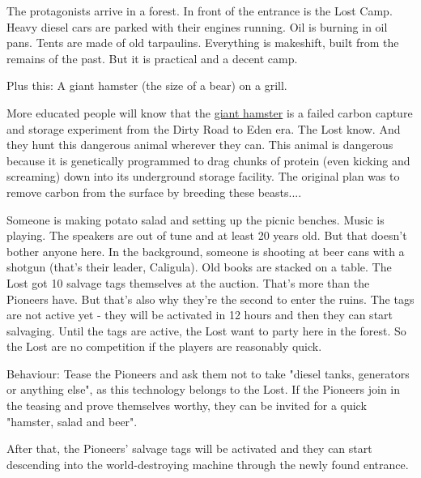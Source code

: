 The protagonists arrive in a forest. In front of the entrance is the Lost Camp. Heavy diesel cars are parked with their engines running. Oil is burning in oil pans. Tents are made of old tarpaulins. Everything is makeshift, built from the remains of the past. But it is practical and a decent camp.

Plus this: A giant hamster (the size of a bear) on a grill.

\begin{sidebarBox}[title=Failed CCS experiment: Hamster]
More educated people will know that the \hyperref[sec: Giant Hamster]{giant hamster} is a failed carbon capture and storage experiment from the Dirty Road to Eden era. The Lost know. And they hunt this dangerous animal wherever they can. This animal is dangerous because it is genetically programmed to drag chunks of protein (even kicking and screaming) down into its underground storage facility. The original plan was to remove carbon from the surface by breeding these beasts....
\end{sidebarBox}

Someone is making potato salad and setting up the picnic benches. Music is playing.
The speakers are out of tune and at least 20 years old. But that doesn't bother anyone here. In the background, someone is shooting at beer cans with a shotgun (that's their leader, Caligula). Old books are stacked on a table.
The Lost got 10 salvage tags themselves at the auction. That's more than the Pioneers have. But that's also why they're the second to enter the ruins. The tags are not active yet - they will be activated in 12 hours and then they can start salvaging. Until the tags are active, the Lost want to party
here in the forest. So the Lost are no competition if the players are reasonably quick.

Behaviour: Tease the Pioneers and ask them not to take "diesel tanks, generators or anything else", as this technology belongs to the Lost. If the Pioneers join in the teasing and prove themselves worthy, they can be invited for a quick "hamster, salad and beer".

After that, the Pioneers' salvage tags will be activated and they can start descending into the world-destroying machine through the newly found entrance.

